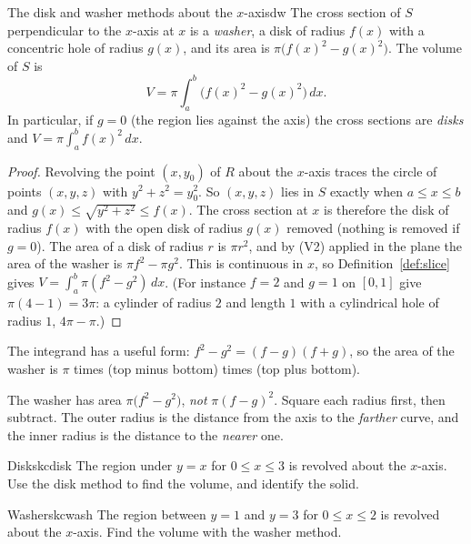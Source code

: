 \documentclass[11pt]{article}
\begin{document}
\begin{thm}{The disk and washer methods about the $x$-axis}{dw}
The cross section of $S$ perpendicular to the $x$-axis at $x$ is a \emph{washer}, a disk of radius $f(x)$ with a concentric hole of radius $g(x)$, and its area is $\pi\bigl(f(x)^2-g(x)^2\bigr)$. The volume of $S$ is
\[
V=\pi\int_a^b\bigl(f(x)^2-g(x)^2\bigr)\,dx .
\]
In particular, if $g=0$ (the region lies against the axis) the cross sections are \emph{disks} and $V=\pi\int_a^bf(x)^2\,dx$.
\end{thm}
\begin{proof}
Revolving the point $(x,y_0)$ of $R$ about the $x$-axis traces the circle of points $(x,y,z)$ with $y^2+z^2=y_0^2$. So $(x,y,z)$ lies in $S$ exactly when $a\le x\le b$ and $g(x)\le\sqrt{y^2+z^2}\le f(x)$. The cross section at $x$ is therefore the disk of radius $f(x)$ with the open disk of radius $g(x)$ removed (nothing is removed if $g=0$). The area of a disk of radius $r$ is $\pi r^2$, and by (V2) applied in the plane the area of the washer is $\pi f^2-\pi g^2$. This is continuous in $x$, so Definition~\ref{def:slice} gives $V=\int_a^b\pi(f^2-g^2)\,dx$. (For instance $f=2$ and $g=1$ on $[0,1]$ give $\pi(4-1)=3\pi$: a cylinder of radius $2$ and length $1$ with a cylindrical hole of radius $1$, $4\pi-\pi$.)
\end{proof}

The integrand has a useful form: $f^2-g^2=(f-g)(f+g)$, so the area of the washer is $\pi$ times (top minus bottom) times (top plus bottom).

\begin{warn}
The washer has area $\pi\bigl(f^2-g^2\bigr)$, \emph{not} $\pi(f-g)^2$. Square each radius first, then subtract. The outer radius is the distance from the axis to the \emph{farther} curve, and the inner radius is the distance to the \emph{nearer} one.
\end{warn}

\begin{kc}{Disks}{kcdisk}
The region under $y=x$ for $0\le x\le3$ is revolved about the $x$-axis. Use the disk method to find the volume, and identify the solid.
\end{kc}

\begin{kc}{Washers}{kcwash}
The region between $y=1$ and $y=3$ for $0\le x\le2$ is revolved about the $x$-axis. Find the volume with the washer method.
\end{kc}
\end{document}
